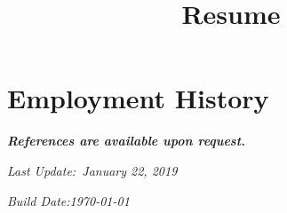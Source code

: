 \documentclass[12pt,a4paper]{moderncv}
\title{Resume}
\begin{document}
\maketitle





\clearpage


\clearpage


%



%

\section{Employment History}











\emph{\textbf{References are available upon request.}}

\vspace{0.5cm}
\emph{Last Update:\space~January 22, 2019}

\emph{Build Date:\space\today}
\end{document}
